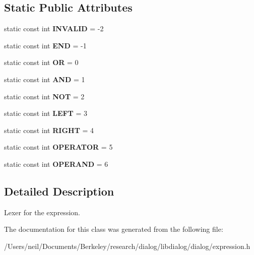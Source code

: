 \subsection*{Static Public Attributes}
\begin{DoxyCompactItemize}
\item 
\mbox{\label{classdialog_1_1expression__lexer_a8a3c153f50a0b5ecd4158bffb9467a9c}} 
static const int {\bfseries I\+N\+V\+A\+L\+ID} = -\/2
\item 
\mbox{\label{classdialog_1_1expression__lexer_a080a9a2bb30395f27786cc6c652802d0}} 
static const int {\bfseries E\+ND} = -\/1
\item 
\mbox{\label{classdialog_1_1expression__lexer_a0c271fa07c268b177cf9422a9dc62ddf}} 
static const int {\bfseries OR} = 0
\item 
\mbox{\label{classdialog_1_1expression__lexer_a5c5af973665a5ad0f84594bc60e19985}} 
static const int {\bfseries A\+ND} = 1
\item 
\mbox{\label{classdialog_1_1expression__lexer_a0e5fda1ce8991fee059dccc924c03d90}} 
static const int {\bfseries N\+OT} = 2
\item 
\mbox{\label{classdialog_1_1expression__lexer_af7dd279996995b7c0e5ee4315f75ec61}} 
static const int {\bfseries L\+E\+FT} = 3
\item 
\mbox{\label{classdialog_1_1expression__lexer_a9bc7735c32393c063f53ef172407827a}} 
static const int {\bfseries R\+I\+G\+HT} = 4
\item 
\mbox{\label{classdialog_1_1expression__lexer_a51173760a05683729ff9ee71c9278f5e}} 
static const int {\bfseries O\+P\+E\+R\+A\+T\+OR} = 5
\item 
\mbox{\label{classdialog_1_1expression__lexer_a841fb8469c5370606435e9c4dbc4e453}} 
static const int {\bfseries O\+P\+E\+R\+A\+ND} = 6
\end{DoxyCompactItemize}


\subsection{Detailed Description}
Lexer for the expression. 

The documentation for this class was generated from the following file\+:\begin{DoxyCompactItemize}
\item 
/\+Users/neil/\+Documents/\+Berkeley/research/dialog/libdialog/dialog/expression.\+h\end{DoxyCompactItemize}
